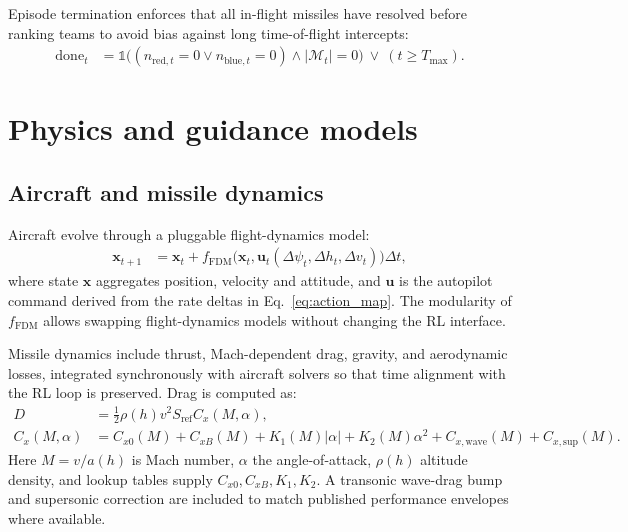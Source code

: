 \documentclass[11pt]{article}
\begin{document}
Episode termination enforces that all in-flight missiles have resolved before ranking teams to avoid bias against long time-of-flight intercepts:
\begin{align}
\text{done}_t &= \mathbb{1}\!\big((n_{\text{red},t}=0 \lor n_{\text{blue},t}=0)\land|\mathcal{M}_t|=0\big)\ \lor\ (t\ge T_{\max}). \label{eq:termination}
\end{align}

\section{Physics and guidance models}
\subsection{Aircraft and missile dynamics}
Aircraft evolve through a pluggable flight-dynamics model:
\begin{align}
\mathbf{x}_{t+1} &= \mathbf{x}_t + f_{\text{FDM}}\big(\mathbf{x}_t, \mathbf{u}_t(\Delta\psi_t,\Delta h_t,\Delta v_t)\big)\Delta t, \label{eq:fdm}
\end{align}
where state $\mathbf{x}$ aggregates position, velocity and attitude, and $\mathbf{u}$ is the autopilot command derived from the rate deltas in Eq.~\eqref{eq:action_map}. The modularity of $f_{\text{FDM}}$ allows swapping flight-dynamics models without changing the RL interface.

Missile dynamics include thrust, Mach-dependent drag, gravity, and aerodynamic losses, integrated synchronously with aircraft solvers so that time alignment with the RL loop is preserved. Drag is computed as:
\begin{align}
D &= \tfrac{1}{2}\rho(h)v^2 S_{\text{ref}} C_x(M,\alpha), \label{eq:drag} \\
C_x(M,\alpha) &= C_{x0}(M) + C_{xB}(M) + K_1(M)|\alpha| + K_2(M)\alpha^2 + C_{x,\text{wave}}(M) + C_{x,\text{sup}}(M). \label{eq:cx}
\end{align}
Here $M=v/a(h)$ is Mach number, $\alpha$ the angle-of-attack, $\rho(h)$ altitude density, and lookup tables supply $C_{x0},C_{xB},K_1,K_2$. A transonic wave-drag bump and supersonic correction are included to match published performance envelopes where available.
\end{document}
